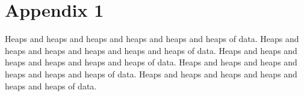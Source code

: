 ﻿\chapter*{Appendix 1}\label{app1}

Heaps and heaps and heaps and heaps and heaps and heaps of data.
Heaps and heaps and heaps and heaps and heaps and heaps of data.
Heaps and heaps and heaps and heaps and heaps and heaps of data.
Heaps and heaps and heaps and heaps and heaps and heaps of data.
Heaps and heaps and heaps and heaps and heaps and heaps of data.
